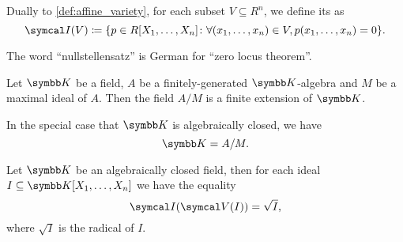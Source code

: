 \begin{definition}\label{def:ideal_of_affine_variety}\cite[70]{Kocev2016}
  Dually to \cref{def:affine_variety}, for each subset \( V \subseteq R^n \), we define its  as
  \begin{equation*}
    \Cal{I}(V) \coloneqq \{ p \in R[X_1, \ldots, X_n] \colon \forall (x_1, \ldots, x_n) \in V, p(x_1, \ldots, x_n) = 0 \}.
  \end{equation*}
\end{definition}

\begin{remark}\label{remark:nullstelletsatz_etymology}
  The word \enquote{nullstellensatz} is German for \enquote{zero locus theorem}.
\end{remark}

\begin{theorem}\label{thm:algebraic_nullstellensatz}\cite[64]{Kocev2016}
  Let \( \K \) be a field, \( A \) be a finitely-generated \( \K \)-algebra and \( M \) be a maximal ideal of \( A \). Then the field \( A / M \) is a finite extension of \( \K \).

  In the special case that \( \K \) is algebraically closed, we have
  \begin{equation*}
    \K = A / M.
  \end{equation*}
\end{theorem}

\begin{theorem}\label{thm:geometric_nullstellensatz}\cite[70]{Kocev2016}
  Let \( \K \) be an algebraically closed field, then for each ideal \( I \subseteq \K[X_1, \ldots, X_n] \) we have the equality
  \begin{equation*}
    \Cal{I}(\Cal{V}(I)) = \sqrt I,
  \end{equation*}
  where \( \sqrt I \) is the radical of \( I \).
\end{theorem}

